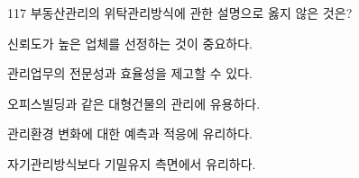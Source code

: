 \begin{question}{117}
부동산관리의 위탁관리방식에 관한 설명으로 옳지 않은 것은?
\begin{choices}
  \item 신뢰도가 높은 업체를 선정하는 것이 중요하다.
  \item 관리업무의 전문성과 효율성을 제고할 수 있다.
  \item 오피스빌딩과 같은 대형건물의 관리에 유용하다.
  \item 관리환경 변화에 대한 예측과 적응에 유리하다.
  \item 자기관리방식보다 기밀유지 측면에서 유리하다.
\end{choices}
\end{question}
